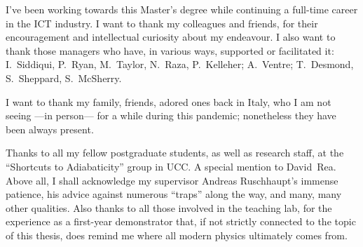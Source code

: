 {
  I've been working towards this Master's degree
  while continuing a full-time career
  in the ICT industry.
  I want to thank my
  colleagues and friends, for their encouragement
  and intellectual curiosity
  about my endeavour.
  I also want to thank those managers
  who have, in various ways, supported or facilitated it:
  I.~Siddiqui, P.~Ryan, M.~Taylor, N.~Raza, P.~Kelleher;
  A.~Ventre;
  T.~Desmond, S.~Sheppard, S.~McSherry.

  I want to thank my family, friends, adored ones back in Italy,
  who I am not seeing ---in person--- for a while during this pandemic;
  nonetheless they have been always present.

  Thanks to all my fellow postgraduate students,
  as well as research staff,
  at the ``Shortcuts to Adiabaticity'' group in UCC.
  A special mention to David~Rea.
  Above all, I shall acknowledge my supervisor Andreas Ruschhaupt's immense patience,
  his advice against numerous ``traps'' along the way, and many, many other qualities.
  Also thanks to all those involved in the teaching lab, for the experience as a
  first-year demonstrator that,
  if not strictly connected to the topic of this thesis,
  does remind me where all modern physics ultimately comes from.
}
